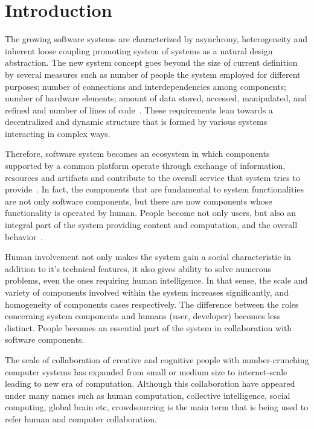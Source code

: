 \chapter{Introduction} 


The growing software systems are characterized by asynchrony, 
heterogeneity and inherent loose coupling promoting system of systems 
as a natural design abstraction. The new system concept goes beyond 
the size of current definition by several measures such as 
number of people the system employed for different purposes; 
number of connections and interdependencies among components; 
number of hardware elements; 
amount of data stored, accessed, manipulated, and refined 
and number of lines of code~\cite{ULSReport}. These requirements lean 
towards a decentralized and dynamic structure that is formed by various 
systems interacting in complex ways.

Therefore, software system becomes an ecosystem in which components supported by 
a common platform operate through exchange of information, resources and 
artifacts and contribute to the overall service that system tries to provide~\cite{Ecosystem}. 
In fact, the components that are fundamental to system 
functionalities are not only software components, but there are now components 
whose functionality is operated by human. People become not only users, 
but also an integral part of the system providing 
content and computation, and the overall behavior~\cite{ULSReport}.

Human involvement not only makes the system gain a social characteristic 
in addition to it's technical features, it also gives ability to solve numerous 
problems, even the ones requiring human intelligence. In that sense, the scale 
and variety of components involved within the system increases significantly, and 
homogeneity of components cases respectively. The difference between 
the roles concerning system components and 
humans (user, developer) becomes less distinct. People becomes an essential 
part of the system in collaboration with software components.

The scale of collaboration of creative and cognitive people with 
number-crunching computer systems has expanded from small or 
medium size to internet-scale~\cite{Dorn2012b} leading to new era of 
computation. Although this collaboration have appeared under many names 
such as human computation, collective intelligence, social computing, 
global brain etc, crowdsourcing is the main term that is being used to refer 
human and computer collaboration.


